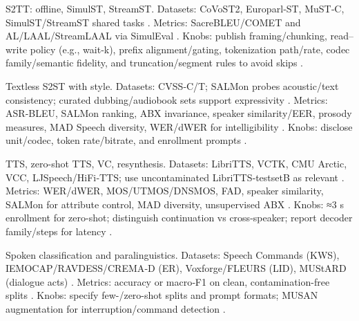 S2TT: offline, SimulST, StreamST. Datasets: CoVoST2, Europarl‑ST, MuST‑C, SimulST/StreamST shared tasks \cite{guo2025streamuniachievingstreamingspeechtransla,chen2024bestowefficientstreamablespeechlanguagem}. Metrics: SacreBLEU/COMET and AL/LAAL/StreamLAAL via SimulEval \cite{guo2025streamuniachievingstreamingspeechtransla}. Knobs: publish framing/chunking, read–write policy (e.g., wait‑k), prefix alignment/gating, tokenization path/rate, codec family/semantic fidelity, and truncation/segment rules to avoid skips \cite{ye2024codecdoesmatterexploringsemanticshortcom,zhao2024textlessstreamingspeechtranslationsemant}.

Textless S2ST with style. Datasets: CVSS‑C/T; SALMon probes acoustic/text consistency; curated dubbing/audiobook sets support expressivity \cite{maimon2025salmonsuiteacousticlanguagemodelevaluati,huang2023holisticcascadesystembenchmarkhumanevalu}. Metrics: ASR‑BLEU, SALMon ranking, ABX invariance, speaker similarity/EER, prosody measures, MAD Speech diversity, WER/dWER for intelligibility \cite{fily2024establishingdegreesclosenessbetweenaudio,futeral2025madspeechmeasuresacousticdiversity,qian2025prosodylmuncoveringemergingprosodyproces,wang2024whydospeechlanguagemodelsfailgeneratesem}. Knobs: disclose unit/codec, token rate/bitrate, and enrollment prompts \cite{peng2024mslms2stmultitaskspeechlanguagemodeltext}.

TTS, zero-shot TTS, VC, resynthesis. Datasets: LibriTTS, VCTK, CMU Arctic, VCC, LJSpeech/HiFi‑TTS; use uncontaminated LibriTTS‑testsetB as relevant \cite{turetzky2024lastlanguagemodelawarespeechtokenization,tseng2025evaluationllmsspeechisoftenflawedtestset}. Metrics: WER/dWER, MOS/UTMOS/DNSMOS, FAD, speaker similarity, SALMon for attribute control, MAD diversity, unsupervised ABX \cite{maimon2025salmonsuiteacousticlanguagemodelevaluati,futeral2025madspeechmeasuresacousticdiversity,fily2024establishingdegreesclosenessbetweenaudio,verma2024whispergpthybridrepresentationaudiolarge}. Knobs: ≈3 s enrollment for zero-shot; distinguish continuation vs cross-speaker; report decoder family/steps for latency \cite{wang2024evaluatingtextspeechsynthesislargediscre}.

Spoken classification and paralinguistics. Datasets: Speech Commands (KWS), IEMOCAP/RAVDESS/CREMA‑D (ER), Voxforge/FLEURS (LID), MUStARD (dialogue acts) \cite{hsu2024exploringcontextlearningtextlessspeechla}. Metrics: accuracy or macro‑F1 on clean, contamination-free splits \cite{tseng2025evaluationllmsspeechisoftenflawedtestset}. Knobs: specify few-/zero-shot splits and prompt formats; MUSAN augmentation for interruption/command detection \cite{ma2024languagemodelcanlistenwhilespeaking}.

